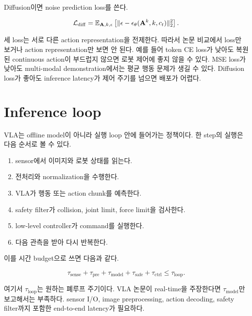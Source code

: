 Diffusion이면 noise prediction loss를 쓴다.

\begin{equation}
  \mathcal{L}_{\mathrm{diff}}
  =
  \mathbb{E}_{\mathbf{A}, k, \epsilon}
  \left[
    \lVert
    \epsilon -
    \epsilon_\theta(\mathbf{A}^k, k, c_t)
    \rVert_2^2
  \right].
  \label{eq:diff_loss}
\end{equation}

세 loss는 서로 다른 action representation을 전제한다. 따라서 논문 비교에서 loss만 보거나 action representation만 보면 안 된다. 예를 들어 token CE loss가 낮아도 복원된 continuous action이 부드럽지 않으면 로봇 제어에 좋지 않을 수 있다. MSE loss가 낮아도 multi-modal demonstration에서는 평균 행동 문제가 생길 수 있다. Diffusion loss가 좋아도 inference latency가 제어 주기를 넘으면 배포가 어렵다.

\section{Inference loop}

VLA는 offline model이 아니라 실행 loop 안에 들어가는 정책이다. 한 step의 실행은 다음 순서로 볼 수 있다.

\begin{enumerate}
  \item sensor에서 이미지와 로봇 상태를 읽는다.
  \item 전처리와 normalization을 수행한다.
  \item VLA가 행동 또는 action chunk를 예측한다.
  \item safety filter가 collision, joint limit, force limit을 검사한다.
  \item low-level controller가 command를 실행한다.
  \item 다음 관측을 받아 다시 반복한다.
\end{enumerate}

이를 시간 budget으로 쓰면 다음과 같다.

\begin{equation}
  \tau_{\mathrm{sense}}
  +
  \tau_{\mathrm{pre}}
  +
  \tau_{\mathrm{model}}
  +
  \tau_{\mathrm{safe}}
  +
  \tau_{\mathrm{ctrl}}
  \le
  \tau_{\mathrm{loop}}.
  \label{eq:inference_loop_budget}
\end{equation}

여기서 $\tau_{\mathrm{loop}}$는 원하는 폐루프 주기이다. VLA 논문이 real-time을 주장한다면 $\tau_{\mathrm{model}}$만 보고해서는 부족하다. sensor I/O, image preprocessing, action decoding, safety filter까지 포함한 end-to-end latency가 필요하다.

